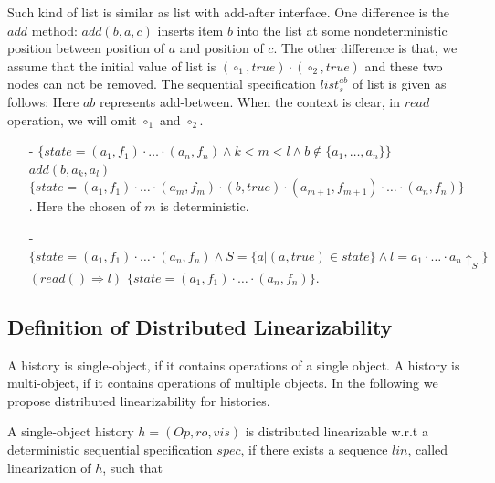{\begin{example}
\label{definition:sequential specification of list with add-after interface}
Such kind of list is similar as list with add-after interface. One difference is the $\mathit{add}$ method: $\mathit{add}(b,a,c)$ inserts item $b$ into the list at some nondeterministic position between position of $a$ and position of $c$. The other difference is that, we assume that the initial value of list is $(\circ_1,\mathit{true}) \cdot (\circ_2,\mathit{true})$ and these two nodes can not be removed. The sequential specification $\mathit{list}_s^{\mathit{ab}}$ of list is given as follows: Here $\mathit{ab}$ represents add-between. When the context is clear, in $\mathit{read}$ operation, we will omit $\circ_1$ and $\circ_2$.
\begin{itemize}
\setlength{\itemsep}{0.5pt}
\item[-] $\{ \mathit{state} = (a_1,f_1) \cdot \ldots \cdot (a_n,f_n) \wedge k < m < l \wedge b \notin \{ a_1, \ldots, a_n \} \}$ $add(b,a_k,a_l)$ $\{ \mathit{state} = (a_1,f_1) \cdot \ldots \cdot (a_m,f_m) \cdot (b,\mathit{true}) \cdot (a_{m+1},f_{m+1}) \cdot \ldots \cdot (a_n,f_n) \}$. Here the chosen of $m$ is deterministic.
\item[-] $\{ \mathit{state} = (a_1,f_1) \cdot \ldots \cdot (a_n,f_n) \wedge S = \{ a \vert (a,\mathit{true}) \in \mathit{state} \} \wedge l = a_1 \cdot \ldots \cdot a_n \uparrow_{S} \}$ $(read() \Rightarrow l)$ $\{ \mathit{state} = (a_1,f_1) \cdot \ldots \cdot (a_n,f_n) \}$.
\end{itemize}
\end{example}







\subsection{Definition of Distributed Linearizability}
\label{subsec:definition of distributed linearizability}

A history is single-object, if it contains operations of a single object. A history is multi-object, if it contains operations of multiple objects. In the following we propose distributed linearizability for histories.


\begin{definition}
\label{definition:distributed linearizability}

A single-object history $h = (\mathit{Op},\mathit{ro},\mathit{vis})$ is distributed linearizable w.r.t a deterministic sequential specification $\mathit{spec}$, if there exists a sequence $\mathit{lin}$, called linearization of $h$, such that


\end{definition}}
